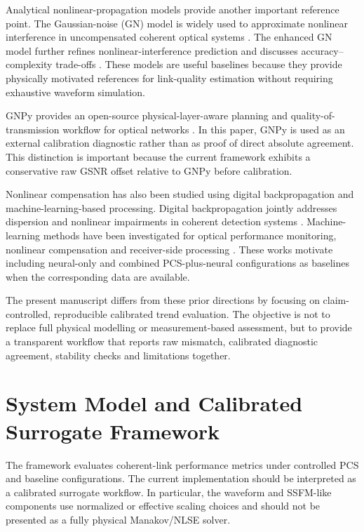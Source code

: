 ﻿\documentclass[pdflatex,sn-mathphys-num]{sn-jnl}
\begin{document}
Analytical nonlinear-propagation models provide another important reference point. The Gaussian-noise (GN) model is widely used to approximate nonlinear interference in uncompensated coherent optical systems \cite{poggiolini2012gn}. The enhanced GN model further refines nonlinear-interference prediction and discusses accuracy--complexity trade-offs \cite{carena2014egn}. These models are useful baselines because they provide physically motivated references for link-quality estimation without requiring exhaustive waveform simulation.

GNPy provides an open-source physical-layer-aware planning and quality-of-transmission workflow for optical networks \cite{ferrari2020gnpy}. In this paper, GNPy is used as an external calibration diagnostic rather than as proof of direct absolute agreement. This distinction is important because the current framework exhibits a conservative raw GSNR offset relative to GNPy before calibration.

Nonlinear compensation has also been studied using digital backpropagation and machine-learning-based processing. Digital backpropagation jointly addresses dispersion and nonlinear impairments in coherent detection systems \cite{ip2008dbp}. Machine-learning methods have been investigated for optical performance monitoring, nonlinear compensation and receiver-side processing \cite{zibar2016ml,lau2018mlopm,tizikara2021opm,bakhshali2023nnnlic}. These works motivate including neural-only and combined PCS-plus-neural configurations as baselines when the corresponding data are available.

The present manuscript differs from these prior directions by focusing on claim-controlled, reproducible calibrated trend evaluation. The objective is not to replace full physical modelling or measurement-based assessment, but to provide a transparent workflow that reports raw mismatch, calibrated diagnostic agreement, stability checks and limitations together.

\section{System Model and Calibrated Surrogate Framework}

The framework evaluates coherent-link performance metrics under controlled PCS and baseline configurations. The current implementation should be interpreted as a calibrated surrogate workflow. In particular, the waveform and SSFM-like components use normalized or effective scaling choices and should not be presented as a fully physical Manakov/NLSE solver.
\end{document}
